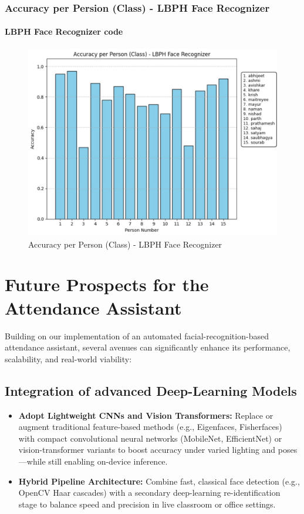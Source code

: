\documentclass[openany]{report}
\begin{document}
\subsection{Accuracy per Persion (Class) - LBPH Face Recognizer}
\subsubsection{LBPH Face Recognizer code}
\lstset{language=Python, basicstyle=\ttfamily\small, numbers=left}

\begin{figure}[H]
    \centering
    \includegraphics[width=.95\textwidth]{imgs/accuracy per person.jpg}
    \caption{Accuracy per Person (Class) - LBPH Face Recognizer}
\end{figure}


\chapter{Future Prospects for the Attendance Assistant }
Building on our implementation of an automated facial-recognition-based attendance assistant, several avenues can significantly enhance its performance, scalability, and real-world viability:
\section{Integration of advanced Deep-Learning Models}
\begin{itemize}
    \item \textbf{Adopt Lightweight CNNs and Vision Transformers:} Replace or augment traditional feature-based methods (e.g., Eigenfaces, Fisherfaces) with compact convolutional neural networks (MobileNet, EfficientNet) or vision-transformer variants to boost accuracy under varied lighting and poses—while still enabling on-device inference.
    \item \textbf{Hybrid Pipeline Architecture:} Combine fast, classical face detection (e.g., OpenCV Haar cascades) with a secondary deep-learning re-identification stage to balance speed and precision in live classroom or office settings.
\end{itemize}
\end{document}
